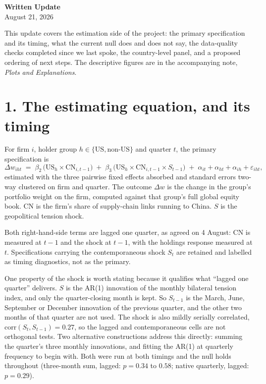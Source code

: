 \documentclass[11pt]{article}
\begin{document}
\begin{center}
{\Large\bfseries Written Update}\\[6pt]
{\normalsize August 21, 2026}
\end{center}

\bigskip

\noindent
This update covers the estimation side of the project: the primary
specification and its timing, what the current null does and does not say,
the data-quality checks completed since we last spoke, the country-level
panel, and a proposed ordering of next steps. The descriptive figures are in
the accompanying note, \emph{Plots and Explanations}.

\section*{1. The estimating equation, and its timing}

For firm $i$, holder group $h \in \{\text{US}, \text{non-US}\}$ and quarter
$t$, the primary specification is
\begin{equation*}
\Delta w_{iht} \;=\; \beta_2\,\bigl(\text{US}_h \times \text{CN}_{i,t-1}\bigr)
\;+\; \beta_3\,\bigl(\text{US}_h \times \text{CN}_{i,t-1} \times S_{t-1}\bigr)
\;+\; \alpha_{it} + \alpha_{ht} + \alpha_{ih} + \varepsilon_{iht},
\end{equation*}
estimated with the three pairwise fixed effects absorbed and standard errors
two-way clustered on firm and quarter. The outcome $\Delta w$ is the change in
the group's portfolio weight on the firm, computed against that group's full
global equity book. CN is the firm's share of supply-chain links running to
China. $S$ is the geopolitical tension shock.

Both right-hand-side terms are lagged one quarter, as agreed on 4 August: CN
is measured at $t-1$ and the shock at $t-1$, with the holdings response
measured at $t$. Specifications carrying the contemporaneous shock $S_t$ are
retained and labelled as timing diagnostics, not as the primary.

One property of the shock is worth stating because it qualifies what ``lagged
one quarter'' delivers. $S$ is the AR(1) innovation of the monthly bilateral
tension index, and only the quarter-closing month is kept. So $S_{t-1}$ is the
March, June, September or December innovation of the previous quarter, and the
other two months of that quarter are not used. The shock is also mildly
serially correlated, $\text{corr}(S_t, S_{t-1}) = 0.27$, so the lagged and
contemporaneous cells are not orthogonal tests. Two alternative constructions
address this directly: summing the quarter's three monthly innovations, and
fitting the AR(1) at quarterly frequency to begin with. Both were run at both
timings and the null holds throughout (three-month sum, lagged: $p = 0.34$ to
$0.58$; native quarterly, lagged: $p = 0.29$).
\end{document}
